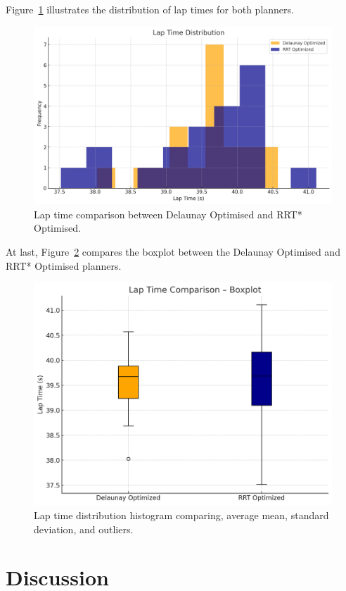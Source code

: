 \documentclass[a4paper,11pt]{report}
\begin{document}
Figure~\ref{fig:distribution} illustrates the distribution of lap times for both planners. 
\begin{figure}[H]
    \centering
    \includegraphics[width=0.9\linewidth]{Images/Laptimedistribution.png}
    \caption{Lap time comparison between Delaunay Optimised and RRT* Optimised.}
    \label{fig:distribution}
\end{figure}

At last, Figure~\ref{fig:laptime} compares the boxplot between the Delaunay Optimised and RRT* Optimised planners. 
\begin{figure}[H]
    \centering
    \includegraphics[width=0.95\linewidth]{Images/Laptimecomparaison.png}
    \caption{Lap time distribution histogram comparing, average mean, standard deviation, and outliers.}
    \label{fig:laptime}
\end{figure}

\section{Discussion}
\end{document}
